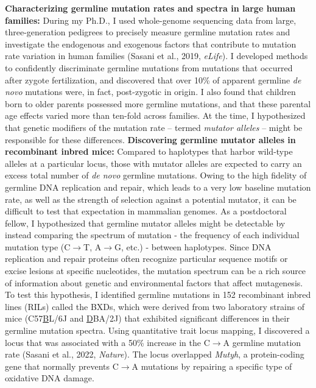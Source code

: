 \documentclass[11pt,a4paper,sans]{moderncv}
\begin{document}
\textbf{Characterizing germline mutation rates and spectra in large 
human families:}  During my Ph.D., I used whole-genome sequencing data from large, three-generation 
pedigrees to precisely measure germline mutation rates and 
investigate the endogenous and exogenous factors that contribute to mutation rate 
variation in human families (Sasani et al., 2019, \emph{eLife}). I developed methods to confidently 
discriminate germline mutations from mutations that occurred after zygote 
fertilization, and discovered that over 10\% of apparent germline \emph{de novo} mutations 
were, in fact, post-zygotic in origin. I also found that children born to older 
parents possessed more germline mutations, and that these parental age effects 
varied more than ten-fold across families. At the time, I hypothesized that 
genetic modifiers of the mutation rate -- termed \emph{mutator alleles} -- might be 
responsible for these differences. 
\break \break
\textbf{Discovering germline mutator alleles in recombinant inbred mice:}  Compared 
to haplotypes that harbor wild-type alleles at a particular locus, 
those with mutator alleles are expected to carry an excess total number 
of \emph{de novo} germline mutations. Owing to the high fidelity of germline DNA 
replication and repair, which leads to a very low baseline mutation rate, as 
well as the strength of selection against a potential mutator, it can be 
difficult to test that expectation in mammalian genomes. As a postdoctoral 
fellow, I hypothesized that germline mutator alleles might be detectable by 
instead comparing the spectrum of mutation - the frequency of each individual 
mutation type (C$\rightarrow$T, A$\rightarrow$G, etc.) - between haplotypes. Since DNA replication and 
repair proteins often recognize particular sequence motifs or excise lesions at 
specific nucleotides, the mutation spectrum can be a rich source of information 
about genetic and environmental factors that affect mutagenesis. To test this 
hypothesis, I identified germline mutations in 152 recombinant inbred 
lines (RILs) called the BXDs, which were derived from two laboratory strains 
of mice (C57\underline{B}L/6J and \underline{D}BA/2J) that exhibited significant differences in their 
germline mutation spectra. Using quantitative trait locus mapping, I 
discovered a locus that was associated with a 50\% increase 
in the C$\rightarrow$A germline mutation rate (Sasani et al., 2022, \emph{Nature}). The locus 
overlapped \emph{Mutyh}, a protein-coding gene that normally prevents C$\rightarrow$A mutations by 
repairing a specific type of oxidative DNA damage. 
\end{document}
